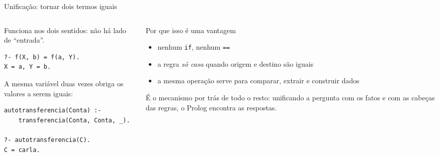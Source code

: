 \documentclass[aspectratio=169,11pt,xcolor=table]{beamer}
\begin{document}
\begin{frame}[fragile]{Unificação: tornar dois termos iguais}
  \begin{columns}[T]
    \begin{column}{0.47\textwidth}
      \small Funciona nos dois sentidos: não há lado de ``entrada''.
\begin{lstlisting}[style=pl]
?- f(X, b) = f(a, Y).
X = a, Y = b.
\end{lstlisting}
      \vspace{8pt}
      A mesma variável duas vezes obriga os valores a serem iguais:
\begin{lstlisting}[style=pl]
autotransferencia(Conta) :-
    transferencia(Conta, Conta, _).

?- autotransferencia(C).
C = carla.
\end{lstlisting}
    \end{column}
    \begin{column}{0.47\textwidth}
      \begin{alertblock}{Por que isso é uma vantagem}
        \small
        \begin{itemize}
          \item nenhum \texttt{if}, nenhum \texttt{==}
          \item a regra \emph{só casa} quando origem e destino são iguais
          \item a mesma operação serve para comparar, extrair e construir dados
        \end{itemize}
      \end{alertblock}
      \vspace{6pt}
      {\small É o mecanismo por trás de todo o resto: unificando a pergunta com
      os fatos e com as cabeças das regras, o Prolog encontra as respostas.}
    \end{column}
  \end{columns}
\end{frame}
\end{document}
